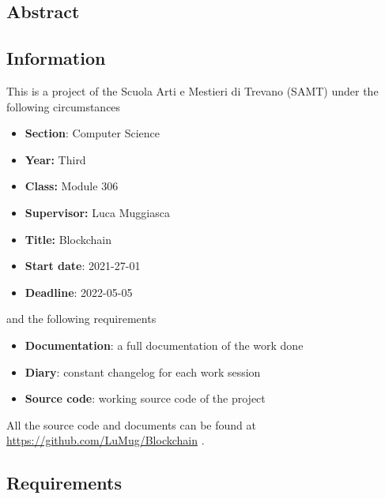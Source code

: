 \documentclass[../documentation.tex]{subfiles}
\begin{document}
\subsection{Abstract}

\subsection{Information}

This is a project of the Scuola Arti e Mestieri di Trevano (SAMT) under the following circumstances

\begin{itemize}
    \item \textbf{Section}: Computer Science
    \item \textbf{Year:} Third
    \item \textbf{Class:} Module 306
    \item \textbf{Supervisor:} Luca Muggiasca
    \item \textbf{Title:} Blockchain
    \item \textbf{Start date}: 2021-27-01
    \item \textbf{Deadline}: 2022-05-05
\end{itemize}

and the following requirements

\begin{itemize}
    \item \textbf{Documentation}: a full documentation of the work done
    \item \textbf{Diary}: constant changelog for each work session
    \item \textbf{Source code}: working source code of the project
\end{itemize}

All the source code and documents can be found at
\href{https://github.com/LuMug/Blockchain}{https://github.com/LuMug/Blockchain}
\cite{gitrepo}.

\pagebreak

\subsection{Requirements}
\end{document}
